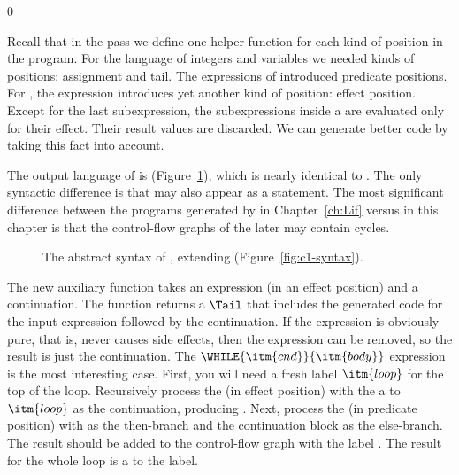\documentclass[7x10,nocrop]{TimesAPriori_MIT}%
\newcommand{\gray}[1]{{\color{gray} #1}}
\def\racketEd{0}
\def\edition{0}
\begin{document}
{\if\edition\racketEd

Recall that in the  pass we define one helper
function for each kind of position in the program.  For the \LangVar{}
language of integers and variables we needed kinds of positions:
assignment and tail. The  expressions of \LangIf{} introduced
predicate positions. For \LangLoop{}, the  expression introduces
yet another kind of position: effect position. Except for the last
subexpression, the subexpressions inside a  are evaluated
only for their effect. Their result values are discarded. We can
generate better code by taking this fact into account.

The output language of  is \LangCLoop{}
(Figure~\ref{fig:c7-syntax}), which is nearly identical to
\LangCIf{}. The only syntactic difference is that  may also
appear as a statement.  The most significant difference between the
programs generated by  in
Chapter~\ref{ch:Lif} versus  in this chapter
is that the control-flow graphs of the later may contain cycles.

\begin{figure}[tp]
\fbox{
\begin{minipage}{0.96\textwidth}
\small
\[
\begin{array}{l}
  \gray{\CvarASTRacket} \\ \hline
  \gray{\CifASTRacket} \\ \hline
  \CloopASTRacket \\
\begin{array}{lcl}
\LangCLoopM{} & ::= & \CPROGRAM{\itm{info}}{\LP\LP\itm{label}\,\key{.}\,\Tail\RP\ldots\RP}
\end{array}
\end{array}
\]
\end{minipage}
}
\caption{The abstract syntax of \LangCLoop{}, extending \LangCIf{} (Figure~\ref{fig:c1-syntax}).}
\label{fig:c7-syntax}
\end{figure}

The new auxiliary function  takes an
expression (in an effect position) and a continuation. The function
returns a $\Tail$ that includes the generated code for the input
expression followed by the continuation. If the expression is
obviously pure, that is, never causes side effects, then the
expression can be removed, so the result is just the continuation.
%
The $\WHILE{\itm{cnd}}{\itm{body}}$ expression is the most interesting
case.  First, you will need a fresh label $\itm{loop}$ for the top of
the loop.  Recursively process the  (in effect position)
with the a  to $\itm{loop}$ as the continuation, producing
. Next, process the  (in predicate position) with
 as the then-branch and the continuation block as the
else-branch. The result should be added to the control-flow graph with
the label . The result for the whole  loop is a
 to the  label.

}
\end{document}
